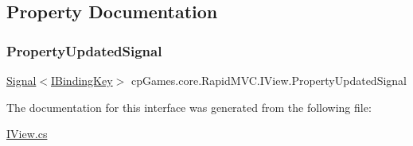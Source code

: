 \subsection{Property Documentation}
\mbox{\label{interfacecp_games_1_1core_1_1_rapid_m_v_c_1_1_i_view_ae21e2d124f1e977c79babb40c3e991e8}} 
\subsubsection{\texorpdfstring{PropertyUpdatedSignal}{PropertyUpdatedSignal}}
{\footnotesize\ttfamily \mbox{\hyperlink{classcp_games_1_1core_1_1_rapid_m_v_c_1_1_signal}{Signal}}$<$\mbox{\hyperlink{interfacecp_games_1_1core_1_1_rapid_m_v_c_1_1_i_binding_key}{I\+Binding\+Key}}$>$ cp\+Games.\+core.\+Rapid\+M\+V\+C.\+I\+View.\+Property\+Updated\+Signal\hspace{0.3cm}{\ttfamily [get]}}



The documentation for this interface was generated from the following file\+:\begin{DoxyCompactItemize}
\item 
\mbox{\hyperlink{_i_view_8cs}{I\+View.\+cs}}\end{DoxyCompactItemize}
